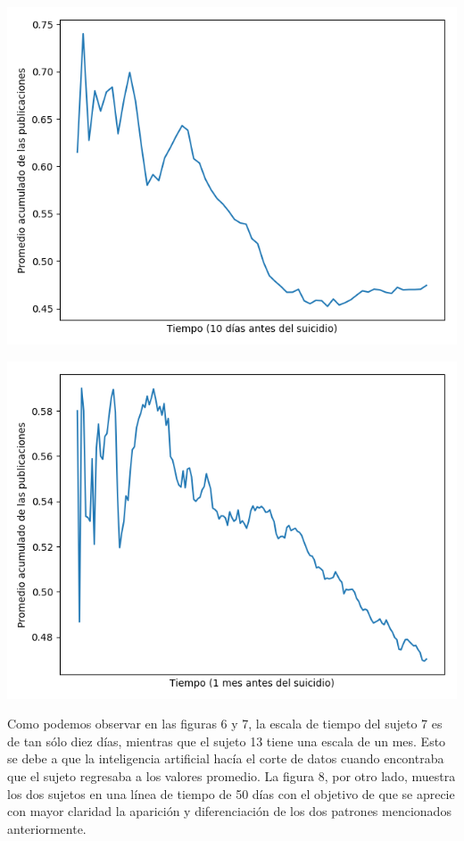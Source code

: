 \documentclass[12pt, donotrepeattitle, jou]{apa6}
\begin{document}
    \begin{center}
        \begin{minipage}{0.45\linewidth}
            \includegraphics[width=\linewidth]{images/score_angie}
        \end{minipage}
        \begin{minipage}{0.45\linewidth}
            \includegraphics[width=\linewidth]{images/score_juan}
        \end{minipage}
    \end{center}
    
    Como podemos observar en las figuras 6 y 7, la escala de tiempo del sujeto 7 es de tan sólo diez días, mientras que el sujeto 13 tiene una escala de un mes. Esto se debe a que la inteligencia artificial hacía el corte de datos cuando encontraba que el sujeto regresaba a los valores promedio. La figura 8, por otro lado, muestra los dos sujetos en una línea de tiempo de 50 días con el objetivo de que se aprecie con mayor claridad la aparición y diferenciación de los dos patrones mencionados anteriormente.
    
\end{document}
